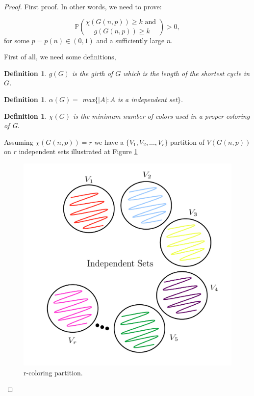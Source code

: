 \documentclass[12pt,twoside,a4paper]{book}
\numberwithin{equation}{section}
\newtheorem{definition}	[theorem] {Definition}
\theoremstyle{remark}
\begin{document}
\begin{proof} First proof.
In other words, we need to prove:

$$\mathbb{P}\binom{\chi(G(n,p)) \geq k \text{ and }} {g(G(n,p)) \geq k} > 0 ,$$
for some $p =p(n) \in (0,1)$ and a sufficiently large $n$.

First of all, we need some definitions,
\begin{definition}\label{def:girth}
$g(G)$ is the girth of $G$ which is the length of the shortest cycle in $G$. 
\end{definition}
\begin{definition}\label{def:independencenumber}
$\alpha(G) =$ max$\{|A|: A$ is a independent set$\}$.
\end{definition}
\begin{definition}\label{def:chromaticnumber}
$\chi(G)$ is the minimum number of colors used in a proper coloring of G.
\end{definition}
Assuming $\chi(G(n,p)) = r$ we have a $\{V_1,V_2,...,V_r\}$ partition of $V(G(n,p))$ on $r$ independent sets illustrated at Figure \ref{fig:r-partition}

\begin{figure}[!htb]
     \centering
     \includegraphics[scale=1]{Figuras/r-partion.jpg}
     \caption{r-coloring partition. }
     \label{fig:r-partition}
\end{figure}


\end{proof}
\end{document}
